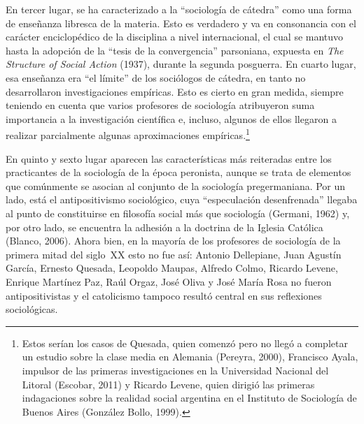 En tercer lugar, se ha caracterizado a la \enquote{sociología de cátedra} como una forma de enseñanza libresca de la materia. Esto es verdadero y va en consonancia con el carácter enciclopédico de la disciplina a nivel internacional, el cual se mantuvo hasta la adopción de la \enquote{tesis de la convergencia} parsoniana, expuesta en \emph{The Structure of Social Action} (1937), durante la segunda posguerra. En cuarto lugar, esa enseñanza era \enquote{el límite} de los sociólogos de cátedra, en tanto no desarrollaron investigaciones empíricas. Esto es cierto en gran medida, siempre teniendo en cuenta que varios profesores de sociología atribuyeron suma importancia a la investigación científica e, incluso, algunos de ellos llegaron a realizar parcialmente algunas aproximaciones empíricas.\footnote{Estos serían los casos de Quesada, quien comenzó pero no llegó a completar un estudio sobre la clase media en Alemania (Pereyra, 2000), Francisco Ayala, impulsor de las primeras investigaciones en la Universidad Nacional del Litoral (Escobar, 2011) y Ricardo Levene, quien dirigió las primeras indagaciones sobre la realidad social argentina en el Instituto de Sociología de Buenos Aires (González Bollo, 1999).}

En quinto y sexto lugar aparecen las características más reiteradas entre los practicantes de la sociología de la época peronista, aunque se trata de elementos que comúnmente se asocian al conjunto de la sociología pregermaniana. Por un lado, está el antipositivismo sociológico, cuya \enquote{especulación desenfrenada} llegaba al punto de constituirse en filosofía social más que sociología (Germani, 1962) y, por otro lado, se encuentra la adhesión a la doctrina de la Iglesia Católica (Blanco, 2006). Ahora bien, en la mayoría de los profesores de sociología de la primera mitad del siglo~XX esto no fue así: Antonio Dellepiane, Juan Agustín García, Ernesto Quesada, Leopoldo Maupas, Alfredo Colmo, Ricardo Levene, Enrique Martínez Paz, Raúl Orgaz, José Oliva y José María Rosa no fueron antipositivistas y el catolicismo tampoco resultó central en sus reflexiones sociológicas.


